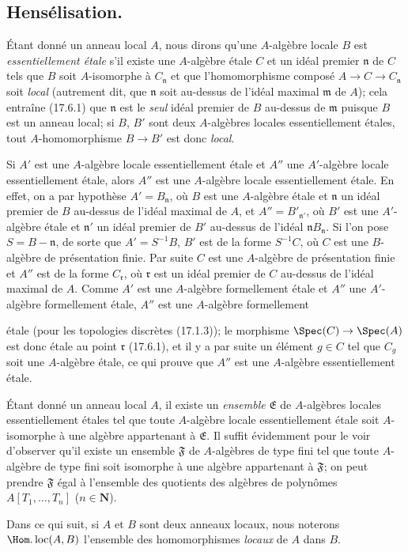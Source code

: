 \subsection{Hensélisation.}
\label{subsection:IV.18.6}

\begin{env}[18.6.1]
\label{IV.18.6.1}
Étant donné un anneau local $A$, nous dirons qu'une $A$-algèbre locale $B$ est \emph{essentiellement étale} s'il existe une $A$-algèbre étale $C$ et un idéal premier $\mathfrak n$ de $C$ tels que $B$ soit $A$-isomorphe à $C_{\mathfrak n}$ et que l'homomorphisme composé $A\to C\to C_{\mathfrak n}$ soit \emph{local} (autrement dit, que $\mathfrak n$ soit au-dessus de l'idéal maximal $\mathfrak m$ de $A$); cela entraîne (17.6.1) que $\mathfrak n$ est le \emph{seul} idéal premier de $B$ au-dessus de $\mathfrak m$ puisque $B$ est un anneau local; si $B$, $B'$ sont deux $A$-algèbres locales essentiellement étales, tout $A$-homomorphisme $B\to B'$ est donc \emph{local}.

Si $A'$ est une $A$-algèbre locale essentiellement étale et $A''$ une $A'$-algèbre locale essentiellement étale, alors $A''$ est une $A$-algèbre locale essentiellement étale. En effet, on a par hypothèse $A'=B_{\mathfrak n}$, où $B$ est une $A$-algèbre étale et $\mathfrak n$ un idéal premier de $B$ au-dessus de l'idéal maximal de $A$, et $A''=B'_{\mathfrak n'}$, où $B'$ est une $A'$-algèbre étale et $\mathfrak n'$ un idéal premier de $B'$ au-dessus de l'idéal $\mathfrak nB_{\mathfrak n}$. Si l'on pose $S=B-\mathfrak n$, de sorte que $A'=S^{-1}B$, $B'$ est de la forme $S^{-1}C$, où $C$ est une $B$-algèbre de présentation finie. Par suite $C$ est une $A$-algèbre de présentation finie et $A''$ est de la forme $C_{\mathfrak r}$, où $\mathfrak r$ est un idéal premier de $C$ au-dessus de l'idéal maximal de $A$. Comme $A'$ est une $A$-algèbre formellement étale et $A''$ une $A'$-algèbre formellement étale, $A''$ est une $A$-algèbre formellement


étale (pour les topologies discrètes (17.1.3)); le morphisme $\Spec(C)\to\Spec(A)$ est donc étale au point $\mathfrak r$ (17.6.1), et il y a par suite un élément $g\in C$ tel que $C_g$ soit une $A$-algèbre étale, ce qui prouve que $A''$ est une $A$-algèbre essentiellement étale.

Étant donné un anneau local $A$, il existe un \emph{ensemble} $\mathfrak E$ de $A$-algèbres locales essentiellement étales tel que toute $A$-algèbre locale essentiellement étale soit $A$-isomorphe à une algèbre appartenant à $\mathfrak E$. Il suffit évidemment pour le voir d'observer qu'il existe un ensemble $\mathfrak F$ de $A$-algèbres de type fini tel que toute $A$-algèbre de type fini soit isomorphe à une algèbre appartenant à $\mathfrak F$; on peut prendre $\mathfrak F$ égal à l'ensemble des quotients des algèbres de polynômes $A[T_1,\ldots,T_n]$ ($n\in\mathbf N$).

Dans ce qui suit, si $A$ et $B$ sont deux anneaux locaux, nous noterons $\Hom.\operatorname{loc}(A,B)$ l'ensemble des homomorphismes \emph{locaux} de $A$ dans $B$.
\end{env}

